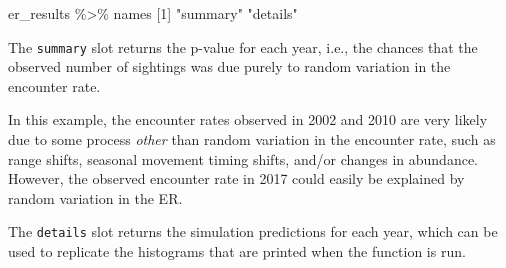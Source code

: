 \documentclass[
]{book}
\newenvironment{Shaded}{\begin{snugshade}}{\end{snugshade}}
\newcommand{\DecValTok}[1]{\textcolor[rgb]{0.00,0.00,0.81}{#1}}
\newcommand{\FloatTok}[1]{\textcolor[rgb]{0.00,0.00,0.81}{#1}}
\newcommand{\NormalTok}[1]{#1}
\newcommand{\SpecialCharTok}[1]{\textcolor[rgb]{0.00,0.00,0.00}{#1}}
\newcommand{\StringTok}[1]{\textcolor[rgb]{0.31,0.60,0.02}{#1}}
\begin{document}
\begin{Shaded}
\begin{Highlighting}[]
\NormalTok{er\_results }\SpecialCharTok{\%\textgreater{}\%}\NormalTok{ names}
\NormalTok{[}\DecValTok{1}\NormalTok{] }\StringTok{"summary"} \StringTok{"details"}
\end{Highlighting}
\end{Shaded}

The \texttt{summary} slot returns the p-value for each year, i.e., the chances that the observed number of sightings was due purely to random variation in the encounter rate.

\begin{Shaded}
\end{Shaded}

In this example, the encounter rates observed in 2002 and 2010 are very likely due to some process \emph{other} than random variation in the encounter rate, such as range shifts, seasonal movement timing shifts, and/or changes in abundance. However, the observed encounter rate in 2017 could easily be explained by random variation in the ER.

The \texttt{details} slot returns the simulation predictions for each year, which can be used to replicate the histograms that are printed when the function is run.
\end{document}
